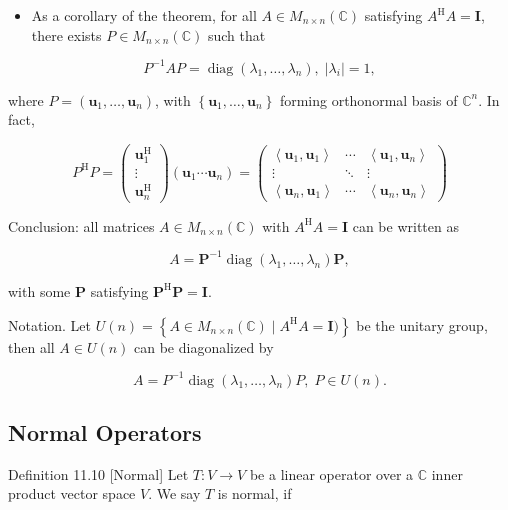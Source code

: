 \documentclass[11pt]{article}
\begin{document}
\begin{itemize}
\item As a corollary of the theorem, for all \(A \in  {M}_{n \times  n}\left( \mathbb{C}\right)\) satisfying \({A}^{\mathrm{H}}A = \mathbf{I}\), there exists \(P \in  {M}_{n \times  n}\left( \mathbb{C}\right)\) such that
\end{itemize}

\[
{P}^{-1}{AP} = \operatorname{diag}\left( {{\lambda }_1,\ldots ,{\lambda }_n}\right) ,\;\left| {\lambda }_{i}\right|  = 1,
\]

where \(P = \left( {{\mathbf{u}}_1,\ldots ,{\mathbf{u}}_n}\right)\), with \(\left\{  {{\mathbf{u}}_1,\ldots ,{\mathbf{u}}_n}\right\}\) forming orthonormal basis of \({\mathbb{C}}^n\). In fact,

\[
{P}^{\mathrm{H}}P = \left( \begin{matrix} {\mathbf{u}}_1^{\mathrm{H}} \\  \vdots \\  {\mathbf{u}}_n^{\mathrm{H}} \end{matrix}\right) \left( {{\mathbf{u}}_1\cdots {\mathbf{u}}_n}\right)  = \left( \begin{matrix} \left\langle  {{\mathbf{u}}_1,{\mathbf{u}}_1}\right\rangle  & \cdots & \left\langle  {{\mathbf{u}}_1,{\mathbf{u}}_n}\right\rangle  \\  \vdots &  \ddots  & \vdots \\  \left\langle  {{\mathbf{u}}_n,{\mathbf{u}}_1}\right\rangle  & \cdots & \left\langle  {{\mathbf{u}}_n,{\mathbf{u}}_n}\right\rangle   \end{matrix}\right)
\]

Conclusion: all matrices \(A \in  {M}_{n \times  n}\left( \mathbb{C}\right)\) with \({A}^{\mathrm{H}}A = \mathbf{I}\) can be written as

\[
A = {\mathbf{P}}^{-1}\operatorname{diag}\left( {{\lambda }_1,\ldots ,{\lambda }_n}\right) \mathbf{P},
\]

with some \(\mathbf{P}\) satisfying \({\mathbf{P}}^{\mathrm{H}}\mathbf{P} = \mathbf{I}\).

Notation. Let \(U\left( n\right)  = \left\{  {A \in  {M}_{n \times  n}\left( \mathbb{C}\right)  \mid  {A}^{\mathrm{H}}A = \mathbf{I})}\right\}\) be the unitary group, then all \(A \in  U\left( n\right)\) can be diagonalized by

\[
A = {P}^{-1}\operatorname{diag}\left( {{\lambda }_1,\ldots ,{\lambda }_n}\right) P,\;P \in  U\left( n\right) .
\]

\subsection{Normal Operators}
Definition 11.10 [Normal] Let \(T : V \rightarrow  V\) be a linear operator over a \(\mathbb{C}\) inner product vector space \(V\). We say \(T\) is normal, if
\end{document}
